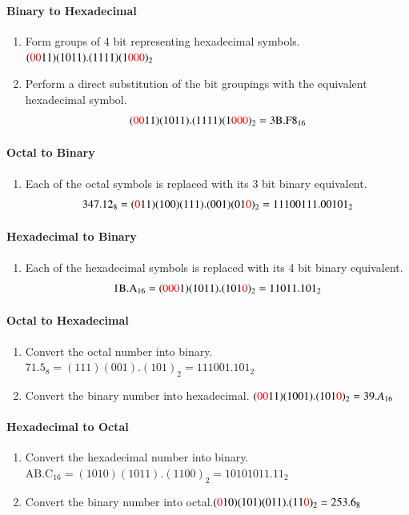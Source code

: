 \documentclass[a4paper]{article}
\begin{document}
\paragraph{Binary to Hexadecimal}
\begin{enumerate}
    \item Form groups of 4 bit representing hexadecimal symbols. \quad $(\textcolor{red}{00}11)(1011).(1111)(1\textcolor{red}{000})_2$
    \item Perform a direct substitution of the bit groupings with the equivalent hexadecimal symbol.
    $$(\textcolor{red}{00}11)(1011).(1111)(1\textcolor{red}{000})_2 = 3\text{B.F}8_{16}$$
\end{enumerate}

\paragraph{Octal to Binary}
\begin{enumerate}
    \item Each of the octal symbols is replaced with its 3 bit binary equivalent.
    $$347.12_8 = (\textcolor{red}{0}11)(100)(111).(001)(01\textcolor{red}{0})_2 = 11100111.00101_2$$
\end{enumerate}

\paragraph{Hexadecimal to Binary}
\begin{enumerate}
    \item Each of the hexadecimal symbols is replaced with its 4 bit binary equivalent.
    $$1\text{B.A}_{16} = (\textcolor{red}{000}1)(1011).(101\textcolor{red}{0})_2 = 11011.101_2$$
\end{enumerate}

\paragraph{Octal to Hexadecimal}
\begin{enumerate}
    \item Convert the octal number into binary.\quad $71.5_8 = (111)(001).(101)_2 = 111001.101_2$
    \item Convert the binary number into hexadecimal. \quad $(\textcolor{red}{00}11)(1001).(101\textcolor{red}{0})_2 = 39.A_{16}$
\end{enumerate}

\paragraph{Hexadecimal to Octal}
\begin{enumerate}
    \item Convert the hexadecimal number into binary.\quad $\text{AB.C}_{16} = (1010)(1011).(1100)_2 = 10101011.11_2$
    \item Convert the binary number into octal.\quad $(\textcolor{red}{0}10)(101)(011).(11\textcolor{red}{0})_2 = 253.6_8$
\end{enumerate}
\end{document}
